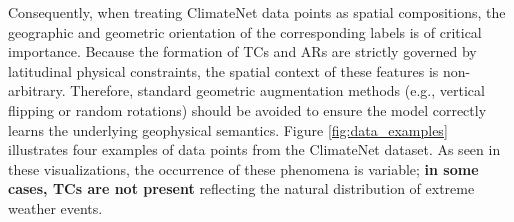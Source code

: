 Consequently, when treating ClimateNet data points as spatial compositions, the geographic and geometric orientation of the corresponding labels is of critical importance. Because the formation of TCs and ARs are strictly governed by latitudinal physical constraints, the spatial context of these features is non-arbitrary. Therefore, standard geometric augmentation methods (e.g., vertical flipping or random rotations) should be avoided to ensure the model correctly learns the underlying geophysical semantics. Figure \ref{fig:data_examples} illustrates four examples of data points from the ClimateNet dataset. As seen in these visualizations, the occurrence of these phenomena is variable; \textbf{in some cases, TCs are not present} reflecting the natural distribution of extreme weather events.

    
    
    
